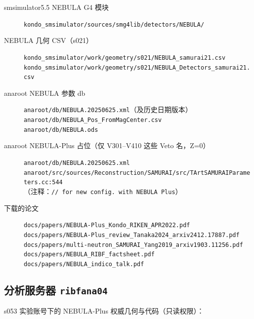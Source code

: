 \documentclass[a4paper,11pt]{ctexart}
\newcommand{\NPL}{NEBULA-Plus}
\begin{document}
\begin{description}
  \item[smsimulator5.5 NEBULA G4 模块]
    \texttt{kondo\_smsimulator/sources/smg4lib/detectors/NEBULA/}
  \item[NEBULA 几何 CSV（s021）]
    \texttt{kondo\_smsimulator/work/geometry/s021/NEBULA\_samurai21.csv} \\
    \texttt{kondo\_smsimulator/work/geometry/s021/NEBULA\_Detectors\_samurai21.csv}
  \item[anaroot NEBULA 参数 db]
    \texttt{anaroot/db/NEBULA.20250625.xml}（及历史日期版本）\\
    \texttt{anaroot/db/NEBULA\_Pos\_FromMagCenter.csv} \\
    \texttt{anaroot/db/NEBULA.ods}
  \item[anaroot \NPL{} 占位（仅 V301--V410 这些 Veto 名，Z=0）]
    \texttt{anaroot/db/NEBULA.20250625.xml}\\
    \texttt{anaroot/src/sources/Reconstruction/SAMURAI/src/TArtSAMURAIParameters.cc:544}
    \\（注释：\texttt{// for new config. with NEBULA Plus}）
  \item[下载的论文]
    \texttt{docs/papers/NEBULA-Plus\_Kondo\_RIKEN\_APR2022.pdf} \\
    \texttt{docs/papers/NEBULA-Plus\_review\_Tanaka2024\_arxiv2412.17887.pdf} \\
    \texttt{docs/papers/multi-neutron\_SAMURAI\_Yang2019\_arxiv1903.11256.pdf} \\
    \texttt{docs/papers/NEBULA\_RIBF\_factsheet.pdf} \\
    \texttt{docs/papers/NEBULA\_indico\_talk.pdf}
\end{description}

\subsection{分析服务器 \texttt{ribfana04}}

s053 实验账号下的 \NPL{} 权威几何与代码（只读权限）：
\end{document}

